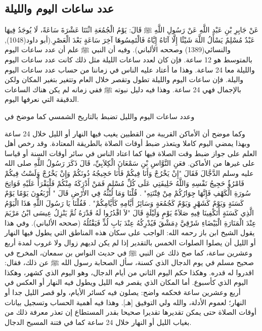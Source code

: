\subsection{عدد ساعات اليوم والليلة}

عَنْ جَابِرِ بْنِ عَبْدِ اللَّهِ عَنْ رَسُولِ اللَّهِ ﷺ قَالَ: يَوْمُ الْجُمُعَةِ اثْنَتَا عَشْرَةَ سَاعَةً، لَا يُوجَدُ فِيهَا عَبْدٌ مُسْلِمٌ يَسْأَلُ اللَّهَ شَيْئًا إِلَّا آتَاهُ إِيَّاهُ فَالْتَمِسُوهَا آخِرَ سَاعَةٍ بَعْدَ الْعَصْرِ.{\footnotesize (أبو داود(1048), والنسائي(1389) وصححه الألباني)}. وفيه أن النبي ﷺ علم أن عدد ساعات اليوم بالمتوسط هو 12 ساعة. فإن كان لعدد ساعات الليلة مثل ذلك كانت عدد ساعات اليوم والليلة معا 24 ساعة. وهذا ما أعتاد عليه الناس في زماننا من حساب عدد ساعات اليوم واليلة. فإن ساعات اليوم والليلة تطول وتقصر خلال العام وتتغير بتغير المكان ولكن بالإجمال فهي 24 ساعة. وهذا فيه دليل نبوته ﷺ ففي زمانه لم يكن هناك الساعات الدقيقة التي نعرفها اليوم.

وعدد ساعات اليوم والليل تضبط بالتاريخ الشمسي كما موضخ في %


وكما موضح أن الأماكن القريبة من القطبين يغيب فيها النهار أو الليل خلال 24 ساعة وبهذا يمضي اليوم كاملا ويتعذر ضبط أوقات الصلاة بالطريقة المعتادة. وقد رخص أهل العلم على جواز ضبط وقت الصلاة فيها كما اعتاد الناس في سائر أوقات السنة أو قياسا على غيرها من الأماكن. فعَنِ النَّوَّاسِ بْنِ سَمْعَانَ الْكِلاَبِيِّ، قَالَ ذَكَرَ رَسُولُ اللَّهِ صلى الله عليه وسلم الدَّجَّالَ فَقَالَ "إِنْ يَخْرُجْ وَأَنَا فِيكُمْ فَأَنَا حَجِيجُهُ دُونَكُمْ وَإِنْ يَخْرُجْ وَلَسْتُ فِيكُمْ فَامْرُؤٌ حَجِيجُ نَفْسِهِ وَاللَّهُ خَلِيفَتِي عَلَى كُلِّ مُسْلِمٍ فَمَنْ أَدْرَكَهُ مِنْكُمْ فَلْيَقْرَأْ عَلَيْهِ فَوَاتِحَ سُورَةِ الْكَهْفِ فَإِنَّهَا جِوَارُكُمْ مِنْ فِتْنَتِهِ" . قُلْنَا وَمَا لُبْثُهُ فِي الأَرْضِ قَالَ " أَرْبَعُونَ يَوْمًا يَوْمٌ كَسَنَةٍ وَيَوْمٌ كَشَهْرٍ وَيَوْمٌ كَجُمُعَةٍ وَسَائِرُ أَيَّامِهِ كَأَيَّامِكُمْ" . فَقُلْنَا يَا رَسُولَ اللَّهِ هَذَا الْيَوْمُ الَّذِي كَسَنَةٍ أَتَكْفِينَا فِيهِ صَلاَةُ يَوْمٍ وَلَيْلَةٍ قَالَ "لاَ اقْدُرُوا لَهُ قَدْرَهُ ثُمَّ يَنْزِلُ عِيسَى ابْنُ مَرْيَمَ عِنْدَ الْمَنَارَةِ الْبَيْضَاءِ شَرْقِيَّ دِمَشْقَ فَيُدْرِكُهُ عِنْدَ بَابِ لُدٍّ فَيَقْتُلُهُ {\footnotesize (صححه الألباني)}.
وفي هذا يقول الشيخ ابن باز رحمه الله:
الواجب على سكان هذه المناطق التي يطول فيها النهار أو الليل أن يصلوا الصلوات الخمس بالتقدير إذا لم يكن لديهم زوال ولا غروب لمدة أربع وعشرين ساعة، كما صح ذلك عن النبي ﷺ في حديث النواس بن سمعان، المخرج في صحيح مسلم في يوم الدجال الذي كسنة، سأل الصحابة رسول الله ﷺ عن ذلك، فقال: اقدروا له قدره. وهكذا حكم اليوم الثاني من أيام الدجال، وهو اليوم الذي كشهر، وهكذا اليوم الذي كأسبوع. أما المكان الذي يقصر فيه الليل ويطول فيه النهار أو العكس في أربع وعشرين ساعة فحكمه واضح: يصلون فيه كسائر الأيام، ولو قصر الليل جدا أو النهار؛ لعموم الأدلة، والله ولي التوفيق [هـ]. وهذا فيه أهمية الحساب وتسجيل بيانات أوقات الصلاة حتى يمكن تقديرها تقديرا صحيحا بقدر المستطاع إن تعذر معرفة ذلك من بغياب الليل أو النهار خلال 24 ساعة كما في فتنة المسيح الدجال.

